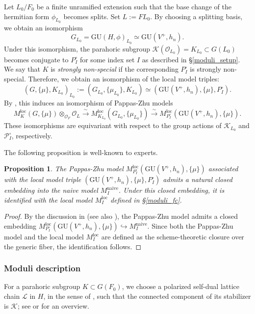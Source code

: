 \documentclass[pdflatex,sn-mathphys-num]{sn-jnl}%
\theoremstyle{thmstyleone}%
\newtheorem{proposition}[subsubsection]{Proposition}%
\theoremstyle{thmstyletwo}%
\numberwithin{equation}{subsection}
\theoremstyle{thmstylethree}%
\newcommand{\CK}{\ensuremath{\mathcal{K}}\xspace}
\newcommand{\CL}{\ensuremath{\mathcal{L}}\xspace}
\newcommand{\CO}{\ensuremath{\mathcal{O}}\xspace}
\newcommand{\CP}{\ensuremath{\mathcal{P}}\xspace}
\newcommand{\GU}{\mathrm{GU}}
\newcommand{\loc}{\ensuremath{\mathrm{loc}}\xspace}
\newcommand{\naive}{\ensuremath{\mathrm{naive}}\xspace}
\begin{document}
Let $L_0/F_0$ be a finite unramified extension such that the base change of the hermitian form $\phi_{L_0}$ becomes splits. 
Set $L:=FL_0$.
By choosing a splitting basis, we obtain an isomorphism
\begin{equation}\label{application_nonsplit:local-model-triple-isom}
    G_{L_0}=\GU(H,\phi)_{L_0}\simeq \GU(V^+,h_n).
\end{equation}
Under this isomorphism, the parahoric subgroup $\CK(\CO_{L_0}) = K_{L_0} \subset G(L_0)$ becomes conjugate to $P_I^\circ$ for some index set $I$ as described in \S\ref{moduli_setup}.
We say that $K$ is \emph{strongly non-special} if the corresponding $P_I^\circ$ is strongly non-special.
Therefore, we obtain an isomorphism of the local model triples:
\begin{equation}\label{application_nonsplit:local-model-isom}
    (G,\{\mu\},K_{L_0})_{L_0}:=(G_{L_0},\{\mu_{L_0}\},K_{L_0})\simeq (\GU(V^+,h_n),\{\mu\},P_I^\circ).
\end{equation}
By \cite[Theorem 2.5, Proposition 2.7]{HPR}, this induces an isomorphism of Pappas-Zhu models
\begin{equation*}
    M_K^\loc(G,\{\mu\})\otimes_{\CO_F}\CO_L\xrightarrow{\sim}M_{K_{L_0}}^\loc(G_{L_0},\{\mu_{L_0}\})\xrightarrow{\sim} M^\loc_{P_{I}^\circ}(\GU(V^+,h_n),\{\mu\}).
\end{equation*}
These isomorphisms are equivariant with respect to the group actions of $\CK_{L_0}$ and $\CP^\circ_{I}$, respectively.

The following proposition is well-known to experts.
\begin{proposition}\label{application_nonsplit:PZ-vs-loc}
The Pappas-Zhu model $M^\loc_{P_{I}^\circ}(\GU(V^+,h_n),\{\mu\})$ associated with the local model triple $(\GU(V^+,h_n),\{\mu\},P_I^\circ)$ admits a natural closed embedding into the naive model $M_I^\naive$. 
Under this closed embedding, it is identified with the local model $M^\loc_I$ defined in \S \ref{moduli_fc}.
\end{proposition}
\begin{proof}
By the discussion in \cite[8.2.4]{PZ2013} (see also \cite[Lemma 4.1]{HPR}), the Pappas-Zhu model admits a closed embedding $M^\loc_{P_{I}^\circ}(\GU(V^+,h_n),\{\mu\})\hookrightarrow M^\naive_I$. 
Since both the Pappas-Zhu model and the local model $M^\loc_I$ are defined as the scheme-theoretic closure over the generic fiber, the identification follows.
\end{proof}
		
\subsubsection{Moduli description}\label{application_nonsplit_moduli}
For a parahoric subgroup $K\subset G(F_0)$, we choose a polarized self-dual lattice chain  $\CL$ in $H$, in the sense of \cite[Definition 3.14]{RZ}, such that the connected component of its stabilizer is $\CK$; see \cite{RZ} or \cite[\S 5]{PZ2013} for an overview.
\end{document}

